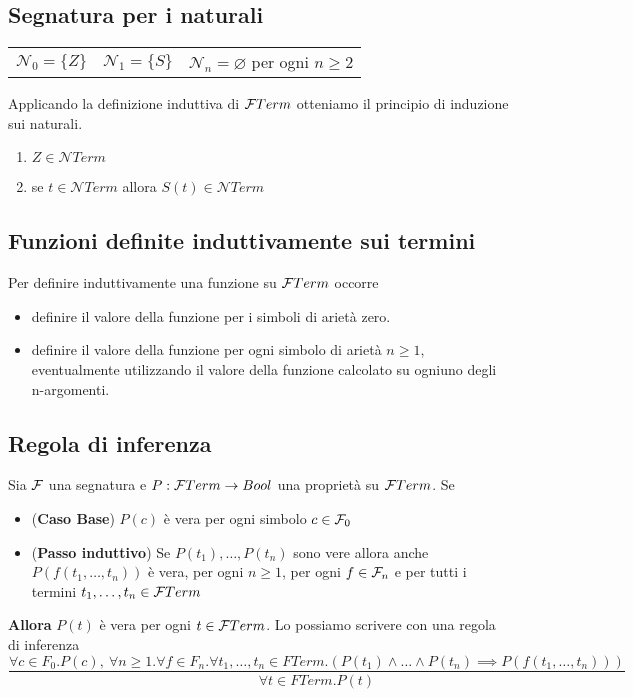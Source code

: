 \documentclass{article}
\begin{document}
\subsection*{Segnatura per i naturali}
\begin{center}
    \begin{tabular}{ccc}
        \(\mathcal{N}_0 = \{Z\}\) & \(\mathcal{N}_1 = \{S\}\) & \(\mathcal{N}_n = \varnothing\) per ogni \(n \geq 2\)
    \end{tabular}
\end{center}
Applicando la definizione induttiva di \(\mathcal{F}Term\) otteniamo il principio di induzione sui naturali.
\begin{enumerate}
    \item \(Z \in \mathcal{N}Term\)
    \item se \(t \in \mathcal{N}Term\) allora \(S(t) \in \mathcal{N}Term\)
\end{enumerate}
\subsection*{Funzioni definite induttivamente sui termini}
Per definire induttivamente una funzione su \(\mathcal{F}Term\) occorre
\begin{itemize}
    \item definire il valore della funzione per i simboli di arietà zero.
    \item definire il valore della funzione per ogni simbolo di arietà \(n \geq 1\), eventualmente utilizzando il valore della funzione calcolato su ogniuno degli n-argomenti.
\end{itemize}
\subsection*{Regola di inferenza}
Sia \(\mathcal{F}\) una segnatura e \(P: \mathcal{F}Term \rightarrow Bool\) una proprietà su \(\mathcal{F}Term\). Se
\begin{itemize}
    \item (\textbf{Caso Base}) \(P(c)\) è vera per ogni simbolo \(c \in \mathcal{F}_0\)
    \item (\textbf{Passo induttivo}) Se \(P(t_1), \ldots, P(t_n)\) sono vere allora anche \(P(f(t_1, \ldots, t_n))\) è vera, per ogni \(n \geq 1\), per ogni \(f \in \mathcal{F}_n\) e per tutti i termini \(t_1, \ldots, t_n \in \mathcal{F}Term\)
\end{itemize}
\textbf{Allora} \(P(t)\) è vera per ogni \(t \in \mathcal{F}Term\). Lo possiamo scrivere con una regola di inferenza
\[\frac{
        \forall c \in F_0 . P(c),\ \forall n \geq 1 . \forall f \in F_n . \forall t_1, \ldots, t_n \in FTerm . (P(t_1) \land \ldots \land P(t_n) \implies P(f(t_1,\ldots,t_n)))
    }{
        \forall t \in FTerm . P(t)
    }
\]
\end{document}
